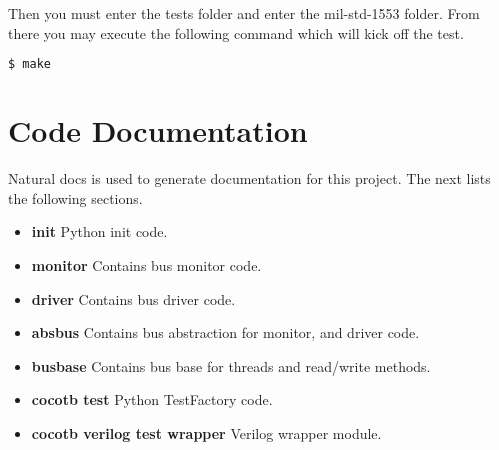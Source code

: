 Then you must enter the tests folder and enter the mil-std-1553 folder. From there you may execute the following command
which will kick off the test.
\begin{lstlisting}[language=bash]
  $ make
\end{lstlisting}

\newpage

\section{Code Documentation} \label{Code Documentation}

\par
Natural docs is used to generate documentation for this project. The next lists the following sections.

\begin{itemize}
  \item \textbf{init} Python init code.\\
  \item \textbf{monitor} Contains bus monitor code.\\
  \item \textbf{driver} Contains bus driver code.\\
  \item \textbf{absbus} Contains bus abstraction for monitor, and driver code.\\
  \item \textbf{busbase} Contains bus base for threads and read/write methods.\\
  \item \textbf{cocotb test} Python TestFactory code.\\
  \item \textbf{cocotb verilog test wrapper} Verilog wrapper module.\\
\end{itemize}

